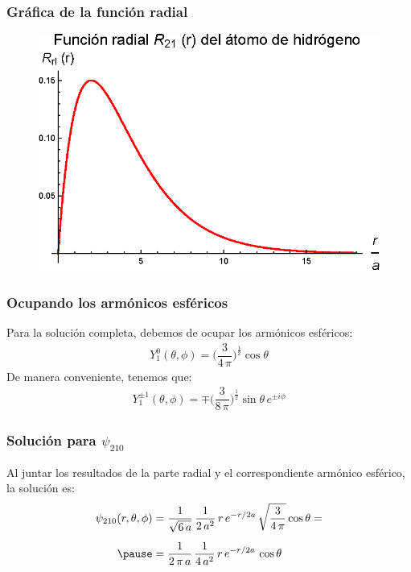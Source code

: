 \documentclass[12pt]{beamer}
\begin{document}
\begin{frame}
\frametitle{Gráfica de la función radial}
\begin{figure}
   \centering
   \includegraphics[scale=1]{Imagenes/Plot_Hermite_Radial_21.eps}
\end{figure}
\end{frame}
\begin{frame}
\frametitle{Ocupando los armónicos esféricos}
Para la solución completa, debemos de ocupar los armónicos esféricos:
\pause
\begin{align*}
Y_{1}^{0} (\theta, \phi) = \bigg( \dfrac{3}{4 \, \pi} \bigg)^{\frac{1}{2}} \cos \theta
\end{align*}
\pause
De manera conveniente, tenemos que:
\pause
\begin{align*}
Y_{1}^{\pm 1} (\theta, \phi) = \mp \bigg( \dfrac{3}{8 \, \pi} \bigg)^{\frac{1}{2}} \sin \theta \, e^{\pm i \phi}
\end{align*}
\end{frame}
\begin{frame}
\frametitle{Solución para $\psi_{210}$}
Al juntar los resultados de la parte radial y el correspondiente armónico esférico, la solución es:
\pause
\begin{eqnarray*}
\begin{aligned}
\psi_{210} (r, \theta, \phi) &= \dfrac{1}{\sqrt{6 \, a}} \, \dfrac{1}{2 \, a^{2}} \, r \, e^{-r/2a} \, \sqrt{\dfrac{3}{4 \, \pi}} \cos \theta = \\[0.5em] \pause
&= \dfrac{1}{2 \, \pi \, a} \, \dfrac{1}{4 \, a^{2}} \, r \, e^{-r/2a} \, \cos \theta
\end{aligned}
\end{eqnarray*}
\end{frame}
\end{document}
